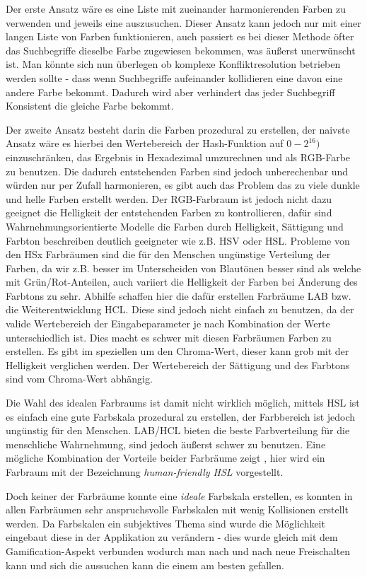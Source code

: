 \documentclass[12pt,twoside]{book}
\begin{document}
Der erste Ansatz wäre es eine Liste mit zueinander harmonierenden Farben zu verwenden und jeweils eine auszusuchen. Dieser Ansatz kann jedoch nur mit einer langen Liste von Farben funktionieren, auch passiert es bei dieser Methode öfter das Suchbegriffe dieselbe Farbe zugewiesen bekommen, was äußerst unerwünscht ist. Man könnte sich nun überlegen ob komplexe Konfliktresolution betrieben werden sollte - dass wenn Suchbegriffe aufeinander kollidieren eine davon eine andere Farbe bekommt.
Dadurch wird aber verhindert das jeder Suchbegriff Konsistent die gleiche Farbe bekommt.

Der zweite Ansatz besteht darin die Farben prozedural zu erstellen,
der naivste Ansatz wäre es hierbei den Wertebereich der Hash-Funktion auf $0 - 2^{16})$ einzuschränken, das Ergebnis in Hexadezimal umzurechnen und als RGB-Farbe zu benutzen. Die dadurch entstehenden Farben sind jedoch unberechenbar und würden nur per Zufall harmonieren, es gibt auch das Problem das zu viele dunkle und helle Farben erstellt werden.
Der RGB-Farbraum ist jedoch nicht dazu geeignet die Helligkeit der entstehenden Farben zu kontrollieren, dafür sind Wahrnehmungsorientierte Modelle  die Farben durch Helligkeit, Sättigung und Farbton beschreiben deutlich geeigneter wie z.B. HSV oder HSL.
Probleme von den HSx Farbräumen sind die für den Menschen ungünstige Verteilung der Farben, da wir z.B. besser im Unterscheiden von Blautönen besser sind als welche mit Grün/Rot-Anteilen, auch variiert die Helligkeit der Farben bei Änderung des Farbtons zu sehr.
Abhilfe schaffen hier die dafür erstellen Farbräume LAB bzw. die Weiterentwicklung HCL. Diese sind jedoch nicht einfach zu benutzen, da der valide Wertebereich der Eingabeparameter je nach Kombination der Werte unterschiedlich ist. Dies macht es schwer mit diesen Farbräumen Farben zu erstellen. Es gibt im speziellen um den Chroma-Wert, dieser kann grob mit der Helligkeit verglichen werden. Der Wertebereich der Sättigung und des Farbtons sind vom Chroma-Wert abhängig.

Die Wahl des idealen Farbraums ist damit nicht wirklich möglich, mittels HSL ist es einfach eine gute Farbskala prozedural zu erstellen, der Farbbereich ist jedoch ungünstig für den Menschen. LAB/HCL bieten die beste Farbverteilung für die menschliche Wahrnehmung, sind jedoch äußerst schwer zu benutzen. Eine mögliche Kombination der Vorteile beider Farbräume zeigt \citep{husl}, hier wird ein Farbraum mit der Bezeichnung \textit{human-friendly HSL} vorgestellt.

Doch keiner der Farbräume konnte eine \textit{ideale} Farbskala erstellen, es konnten in allen Farbräumen sehr anspruchsvolle Farbskalen mit wenig Kollisionen erstellt werden. Da Farbskalen ein subjektives Thema sind wurde die Möglichkeit eingebaut diese in der Applikation zu verändern - dies wurde gleich mit dem Gamification-Aspekt verbunden wodurch man nach und nach neue Freischalten kann und sich die aussuchen kann die einem am besten gefallen.
\end{document}
